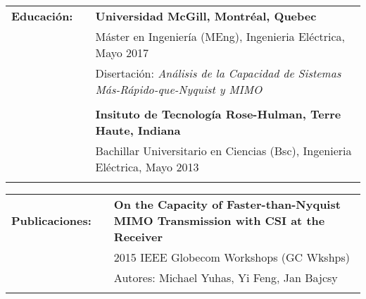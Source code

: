 \documentclass{minimal}
\begin{document}
\begin{tabular}{ p{1.5cm} p{1cm} p{16cm} }
\textbf{Educación:} & & \textbf{Universidad McGill, Montréal, Quebec} \\
& & Máster en Ingeniería (MEng), Ingenieria Eléctrica, Mayo 2017\\
& & Disertación: \textit{Análisis de la Capacidad de Sistemas Más-Rápido-que-Nyquist y MIMO}\\
& & \\
& & \textbf{Insituto de Tecnología Rose-Hulman, Terre Haute, Indiana} \\
& & Bachillar Universitario en Ciencias (Bsc), Ingenieria Eléctrica, Mayo 2013\\
& & \\
\end{tabular}

\begin{tabular}{ p{1.5cm} p{1cm} p{16cm} }
\textbf{Publicaciones:} & & \textbf{On the Capacity of Faster-than-Nyquist MIMO Transmission with CSI at the Receiver}\\
& & 2015 IEEE Globecom Workshops (GC Wkshps)\\
& & Autores: Michael Yuhas, Yi Feng, Jan Bajcsy\\
& & \\
\end{tabular}
\end{document}
